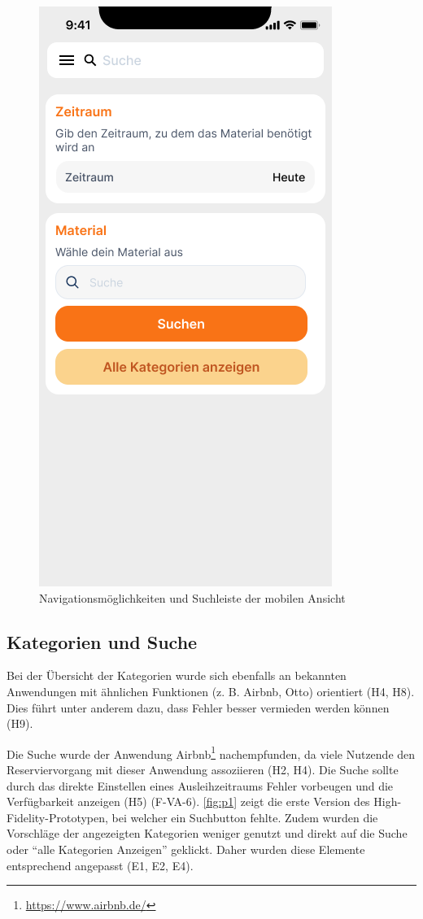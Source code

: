 \begin{figure}[h]
    \includegraphics[scale=0.3]{Bilder/Prototyp/Neu/Suche V2.png}
    \caption{Navigationsmöglichkeiten und Suchleiste der mobilen Ansicht}
    \label{fig:nav}
\end{figure}

\subsection{Kategorien und Suche}
Bei der Übersicht der Kategorien wurde sich ebenfalls an bekannten Anwendungen
mit ähnlichen Funktionen (z. B. Airbnb, Otto) orientiert (H4, H8). Dies führt
unter anderem dazu, dass Fehler besser vermieden werden können (H9).

Die Suche wurde der Anwendung Airbnb\footnote{\url{https://www.airbnb.de/}}
nachempfunden, da viele Nutzende den Reserviervorgang mit dieser Anwendung
assoziieren (H2, H4). Die Suche sollte durch das direkte Einstellen eines
Ausleihzeitraums Fehler vorbeugen und die Verfügbarkeit anzeigen (H5) (F-VA-6).
\ref{fig:p1} zeigt die erste Version des High-Fidelity-Prototypen, bei welcher
ein Suchbutton fehlte. Zudem wurden die Vorschläge der angezeigten Kategorien
weniger genutzt und direkt auf die Suche oder \enquote{alle Kategorien Anzeigen}
geklickt. Daher wurden diese Elemente entsprechend angepasst (E1, E2, E4).

